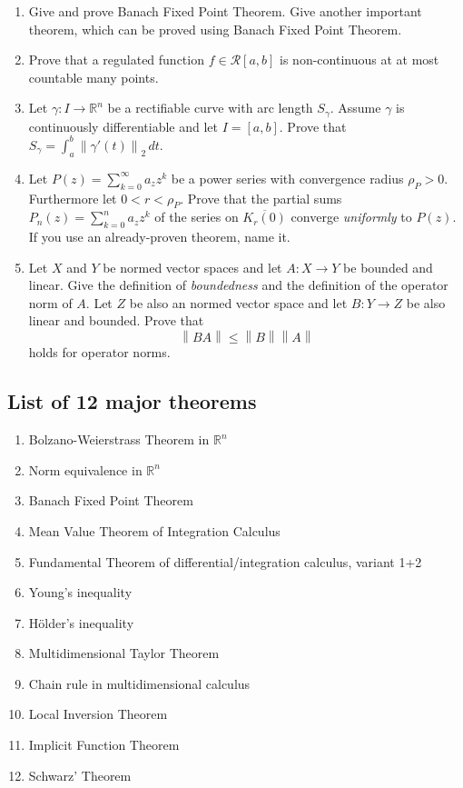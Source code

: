 \documentclass{article}
\newcommand{\norm}[1]{\left\|#1\right\|}
\begin{document}
\begin{enumerate}
  \item Give and prove Banach Fixed Point Theorem. Give another important theorem, which can be proved using Banach Fixed Point Theorem.
  \item Prove that a regulated function $f \in \mathcal R[a,b]$ is non-continuous at at most countable many points.
  \item Let $\gamma: I \to \mathbb R^n$ be a rectifiable curve with arc length $S_\gamma$. Assume $\gamma$ is continuously differentiable and let $I = [a,b]$. Prove that $S_\gamma = \int_a^b \norm{\gamma'(t)}_2 \, dt$.
  \item Let $P(z) = \sum_{k=0}^\infty a_z z^k$ be a power series with convergence radius $\rho_P > 0$. Furthermore let $0 < r < \rho_P$. Prove that the partial sums $P_n(z) = \sum_{k=0}^n a_z z^k$ of the series on $\overline{K_r(0)}$ converge \emph{uniformly} to $P(z)$. If you use an already-proven theorem, name it.
  \item Let $X$ and $Y$ be normed vector spaces and let $A: X \to Y$ be bounded and linear. Give the definition of \emph{boundedness} and the definition of the operator norm of $A$. Let $Z$ be also an normed vector space and let $B: Y \to Z$ be also linear and bounded. Prove that
  \[ \norm{BA} \leq \norm{B} \norm{A} \]
  holds for operator norms.
\end{enumerate}

\subsection*{List of 12 major theorems}

\begin{enumerate}
  \item Bolzano-Weierstrass Theorem in $\mathbb R^n$
  \item Norm equivalence in $\mathbb R^n$
  \item Banach Fixed Point Theorem
  \item Mean Value Theorem of Integration Calculus
  \item Fundamental Theorem of differential/integration calculus, variant 1+2
  \item Young's inequality
  \item H\"older's inequality
  \item Multidimensional Taylor Theorem
  \item Chain rule in multidimensional calculus
  \item Local Inversion Theorem
  \item Implicit Function Theorem
  \item Schwarz' Theorem
\end{enumerate}
\end{document}
